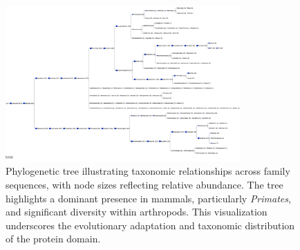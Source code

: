 \begin{figure}[h!]
    \centering
    \includegraphics[width=0.8\textwidth]{images/phylogenetic_tree_freq.png}
    \caption{Phylogenetic tree illustrating taxonomic relationships across family sequences, with node sizes reflecting relative abundance. The tree highlights a dominant presence in mammals, particularly \textit{Primates}, and significant diversity within arthropods. This visualization underscores the evolutionary adaptation and taxonomic distribution of the protein domain.}
    \label{fig:phylo-tree}
\end{figure}